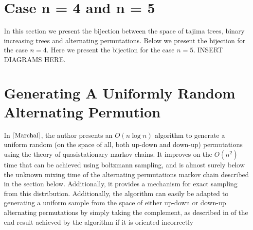 \documentclass[11pt]{article}
\begin{document}
\section{Case n = 4 and n = 5}
In this section we present the bijection between the space of tajima trees, binary increasing trees and  alternating permutations.
Below we present the bijection for the case $n = 4$.
Here we present the bijection for the case $n = 5$. INSERT DIAGRAMS HERE. 

\section{Generating A Uniformly Random Alternating Permution}
In $\cite{Marchal}$, the author presents an $O\left(n\log n\right)$ algorithm to generate a uniform random (on the space of all, both up-down and down-up) permutations using the theory of quasistationary markov chains. It improves on the $O\left(n^2\right)$ time that can be achieved using boltzmann sampling, and is almost surely below the unknown mixing time of the alternating permutations markov chain described in the section below. Additionally, it provides a mechanism for exact sampling from this distribution. Additionally, the algorithm can easily be adapted to generating a uniform sample from the space of either up-down or down-up alternating permutations by simply taking the complement, as described in \cite{Donaghey} of the end result achieved by the algorithm if it is oriented incorrectly
\end{document}
